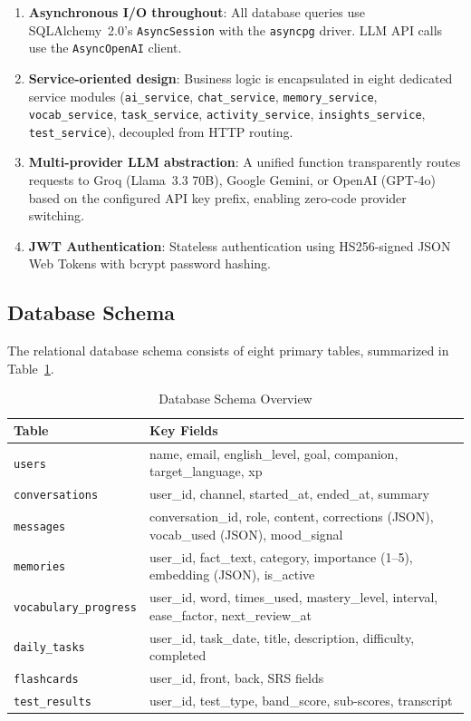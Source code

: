 \documentclass[conference]{IEEEtran}
\begin{document}
\begin{enumerate}[leftmargin=*]
    \item \textbf{Asynchronous I/O throughout}: All database queries use SQLAlchemy~2.0's \texttt{AsyncSession} with the \texttt{asyncpg} driver. LLM API calls use the \texttt{AsyncOpenAI} client.
    \item \textbf{Service-oriented design}: Business logic is encapsulated in eight dedicated service modules (\texttt{ai\_service}, \texttt{chat\_service}, \texttt{memory\_service}, \texttt{vocab\_service}, \texttt{task\_service}, \texttt{activity\_service}, \texttt{insights\_service}, \texttt{test\_service}), decoupled from HTTP routing.
    \item \textbf{Multi-provider LLM abstraction}: A unified function transparently routes requests to Groq (Llama~3.3 70B), Google Gemini, or OpenAI (GPT-4o) based on the configured API key prefix, enabling zero-code provider switching.
    \item \textbf{JWT Authentication}: Stateless authentication using HS256-signed JSON Web Tokens with bcrypt password hashing.
\end{enumerate}

\subsection{Database Schema}

The relational database schema consists of eight primary tables, summarized in Table~\ref{tab:schema}.

\begin{table}[htbp]
\caption{Database Schema Overview}
\label{tab:schema}
\centering
\footnotesize
\begin{tabular}{@{}p{2.0cm}p{5.8cm}@{}}
\toprule
\textbf{Table} & \textbf{Key Fields} \\
\midrule
\texttt{users} & name, email, english\_level, goal, companion, target\_language, xp \\
\texttt{conversations} & user\_id, channel, started\_at, ended\_at, summary \\
\texttt{messages} & conversation\_id, role, content, corrections (JSON), vocab\_used (JSON), mood\_signal \\
\texttt{memories} & user\_id, fact\_text, category, importance (1--5), embedding (JSON), is\_active \\
\texttt{vocabulary\_progress} & user\_id, word, times\_used, mastery\_level, interval, ease\_factor, next\_review\_at \\
\texttt{daily\_tasks} & user\_id, task\_date, title, description, difficulty, completed \\
\texttt{flashcards} & user\_id, front, back, SRS fields \\
\texttt{test\_results} & user\_id, test\_type, band\_score, sub-scores, transcript \\
\bottomrule
\end{tabular}
\end{table}
\end{document}
